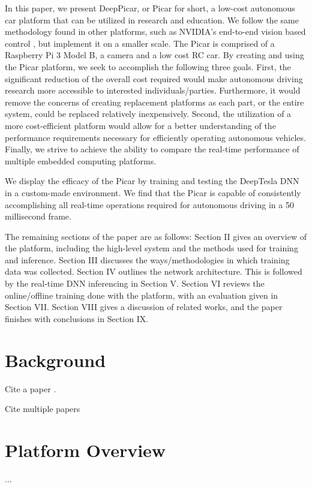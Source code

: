 \documentclass[10pt, conference]{IEEEtran}
\begin{document}
In this paper, we present DeepPicar, or Picar for short, a low-cost
autonomous car platform that can be utilized in research and
education. We follow the same methodology found in other platforms,
such as NVIDIA’s end-to-end vision based control \cite{}, but
implement it on a smaller scale. The Picar is comprised of a Raspberry
Pi 3 Model B, a camera and a low cost RC car. By creating and using
the Picar platform, we seek to accomplish the following three
goals. First, the significant reduction of the overall cost required
would make autonomous driving research more accessible to interested
individuals/parties. Furthermore, it would remove the concerns of
creating replacement platforms as each part, or the entire system,
could be replaced relatively inexpensively. Second, the utilization of
a more cost-efficient platform would allow for a better understanding
of the performance requirements necessary for efficiently operating
autonomous vehicles. Finally, we strive to achieve the ability to
compare the real-time performance of multiple embedded computing
platforms. 

We display the efficacy of the Picar by training and testing the
DeepTesla DNN \cite{} in a custom-made environment. We find that the
Picar is capable of consistently accomplishing all real-time
operations required for autonomous driving in a 50 millisecond frame. 

The remaining sections of the paper are as follows: Section II gives
an overview of the platform, including the high-level system and the
methods used for training and inference. Section III discusses the
ways/methodologies in which training data was collected. Section IV
outlines the network architecture. This is followed by the real-time
DNN inferencing in Section V. Section VI reviews the online/offline
training done with the platform, with an evaluation given in Section
VII. Section VIII gives a discussion of related works, and the paper
finishes with conclusions in Section IX. 

\section{Background}
Cite a paper \cite{barroso2009datacenter}.

Cite multiple papers \cite{banga99resourcecontainers,barroso2009datacenter}

\section{Platform Overview}
...
\end{document}
